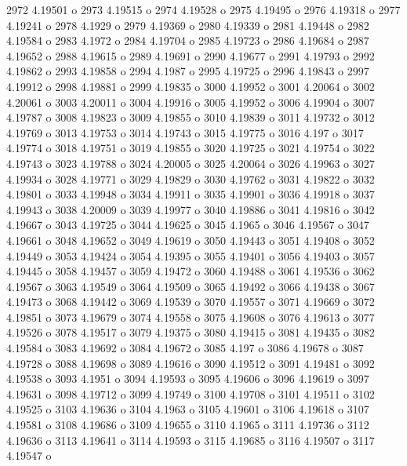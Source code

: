  2972  4.19501  o
 2973  4.19515  o
 2974  4.19528  o
 2975  4.19495  o
 2976  4.19318  o
 2977  4.19241  o
 2978  4.1929  o
 2979  4.19369  o
 2980  4.19339  o
 2981  4.19448  o
 2982  4.19584  o
 2983  4.1972  o
 2984  4.19704  o
 2985  4.19723  o
 2986  4.19684  o
 2987  4.19652  o
 2988  4.19615  o
 2989  4.19691  o
 2990  4.19677  o
 2991  4.19793  o
 2992  4.19862  o
 2993  4.19858  o
 2994  4.1987  o
 2995  4.19725  o
 2996  4.19843  o
 2997  4.19912  o
 2998  4.19881  o
 2999  4.19835  o
 3000  4.19952  o
 3001  4.20064  o
 3002  4.20061  o
 3003  4.20011  o
 3004  4.19916  o
 3005  4.19952  o
 3006  4.19904  o
 3007  4.19787  o
 3008  4.19823  o
 3009  4.19855  o
 3010  4.19839  o
 3011  4.19732  o
 3012  4.19769  o
 3013  4.19753  o
 3014  4.19743  o
 3015  4.19775  o
 3016  4.197  o
 3017  4.19774  o
 3018  4.19751  o
 3019  4.19855  o
 3020  4.19725  o
 3021  4.19754  o
 3022  4.19743  o
 3023  4.19788  o
 3024  4.20005  o
 3025  4.20064  o
 3026  4.19963  o
 3027  4.19934  o
 3028  4.19771  o
 3029  4.19829  o
 3030  4.19762  o
 3031  4.19822  o
 3032  4.19801  o
 3033  4.19948  o
 3034  4.19911  o
 3035  4.19901  o
 3036  4.19918  o
 3037  4.19943  o
 3038  4.20009  o
 3039  4.19977  o
 3040  4.19886  o
 3041  4.19816  o
 3042  4.19667  o
 3043  4.19725  o
 3044  4.19625  o
 3045  4.1965  o
 3046  4.19567  o
 3047  4.19661  o
 3048  4.19652  o
 3049  4.19619  o
 3050  4.19443  o
 3051  4.19408  o
 3052  4.19449  o
 3053  4.19424  o
 3054  4.19395  o
 3055  4.19401  o
 3056  4.19403  o
 3057  4.19445  o
 3058  4.19457  o
 3059  4.19472  o
 3060  4.19488  o
 3061  4.19536  o
 3062  4.19567  o
 3063  4.19549  o
 3064  4.19509  o
 3065  4.19492  o
 3066  4.19438  o
 3067  4.19473  o
 3068  4.19442  o
 3069  4.19539  o
 3070  4.19557  o
 3071  4.19669  o
 3072  4.19851  o
 3073  4.19679  o
 3074  4.19558  o
 3075  4.19608  o
 3076  4.19613  o
 3077  4.19526  o
 3078  4.19517  o
 3079  4.19375  o
 3080  4.19415  o
 3081  4.19435  o
 3082  4.19584  o
 3083  4.19692  o
 3084  4.19672  o
 3085  4.197  o
 3086  4.19678  o
 3087  4.19728  o
 3088  4.19698  o
 3089  4.19616  o
 3090  4.19512  o
 3091  4.19481  o
 3092  4.19538  o
 3093  4.1951  o
 3094  4.19593  o
 3095  4.19606  o
 3096  4.19619  o
 3097  4.19631  o
 3098  4.19712  o
 3099  4.19749  o
 3100  4.19708  o
 3101  4.19511  o
 3102  4.19525  o
 3103  4.19636  o
 3104  4.1963  o
 3105  4.19601  o
 3106  4.19618  o
 3107  4.19581  o
 3108  4.19686  o
 3109  4.19655  o
 3110  4.1965  o
 3111  4.19736  o
 3112  4.19636  o
 3113  4.19641  o
 3114  4.19593  o
 3115  4.19685  o
 3116  4.19507  o
 3117  4.19547  o

